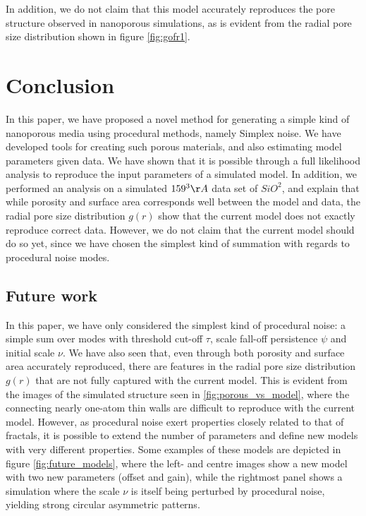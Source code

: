 \documentclass[aps,pre,twocolumn,letterpaper,floatfix,showpacs]{revtex4}
\begin{document}
In addition, we do not claim that this model accurately reproduces the pore structure observed in nanoporous simulations, as is evident from the radial pore size distribution shown in figure \ref{fig:gofr1}.






\section{Conclusion}
In this paper, we have proposed a novel method for generating a simple kind of nanoporous media using procedural methods, namely Simplex noise. We have developed tools for creating such porous materials, and also estimating model parameters given data. We have shown that it is possible through a full likelihood analysis to reproduce the input parameters of a simulated model. In addition, we performed an analysis on a simulated $159^3 \AA$ data set of $SiO^2$, and explain that while porosity and surface area corresponds well between the model and data, the radial pore size distribution $g(r)$ show that the current model does not exactly reproduce correct data. However, we do not claim that the current model should do so yet, since we have chosen the simplest kind of summation with regards to procedural noise modes. 

\subsection{Future work}
In this paper, we have only considered the simplest kind of procedural noise: a simple sum over modes with threshold cut-off $\tau$, scale fall-off persistence $\psi$ and initial scale $\nu$. We have also seen that, even through both porosity and surface area accurately reproduced, there are features in the radial pore size distribution $g(r)$ that are not fully captured with the current model. This is evident from the images of the simulated structure seen in \ref{fig:porous_vs_model}, where the connecting nearly one-atom thin walls are difficult to reproduce with the current model. However, as procedural noise exert properties closely related to that of fractals, it is possible to extend the number of parameters and define new models with very different properties. Some examples of these models are depicted in figure \ref{fig:future_models}, where the left- and centre images show a new model with two new parameters (offset and gain), while the rightmost panel shows a simulation where the scale $\nu$ is itself being perturbed by procedural noise, yielding strong circular asymmetric patterns.   
\end{document}
